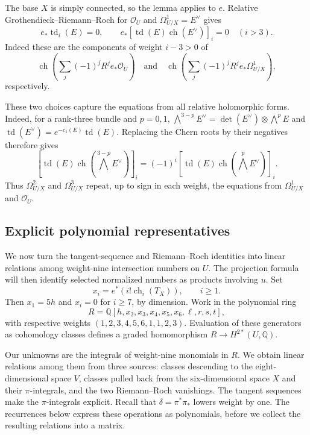 The base $X$ is simply connected, so the lemma applies to $e$.
Relative Grothendieck--Riemann--Roch
\cite[\S7, p.~113]{BorelSerre1958} for $\mathcal O_U$ and
$\Omega^1_{U/X}=E^\vee$ gives
\begin{equation}\label{eq:grr-vanishings}
 e_*\operatorname{td}_i(E)=0,
 \qquad
 e_*[\operatorname{td}(E)\operatorname{ch}(E^\vee)]_i=0
 \quad(i>3).
\end{equation}
Indeed these are the components of weight $i-3>0$ of
\[
 \operatorname{ch}\!\left(\sum_j(-1)^jR^je_*\mathcal O_U\right)
 \quad\text{and}\quad
 \operatorname{ch}\!\left(\sum_j(-1)^jR^je_*\Omega^1_{U/X}\right),
\]
respectively.

These two choices capture the equations from all relative holomorphic
forms. Indeed, for a rank-three bundle and $p=0,1$,
$\bigwedge^{3-p}E^\vee=\det(E^\vee)\otimes\bigwedge^pE$ and
$\operatorname{td}(E^\vee)=e^{-c_1(E)}\operatorname{td}(E)$.
Replacing the Chern roots by their negatives therefore gives
\[
 [\operatorname{td}(E)\operatorname{ch}(\textstyle\bigwedge^{3-p}E^\vee)]_i
 =(-1)^i
 [\operatorname{td}(E)\operatorname{ch}(\textstyle\bigwedge^pE^\vee)]_i.
\]
Thus $\Omega^2_{U/X}$ and $\Omega^3_{U/X}$ repeat, up to sign in
each weight, the equations from $\Omega^1_{U/X}$ and $\mathcal O_U$.

\subsection{Explicit polynomial representatives}

We now turn the tangent-sequence and Riemann--Roch identities into
linear relations among weight-nine intersection numbers on $U$. The
projection formula will then identify selected normalized numbers as
products involving $u$.
Set
\[
 x_i=e^*(i!\operatorname{ch}_i(T_X)),\qquad i\ge1.
\]
Then $x_1=5h$ and $x_i=0$ for $i\ge7$, by dimension. Work in the
polynomial ring
\[
 R=\mathbb Q[h,x_2,x_3,x_4,x_5,x_6,\ell,r,s,t],
\]
with respective weights $(1,2,3,4,5,6,1,1,2,3)$.
Evaluation of these generators as cohomology classes defines a graded
homomorphism $R\to H^{2*}(U,\mathbb Q)$.

Our unknowns are the integrals of weight-nine monomials in $R$.
We obtain linear relations among them from three sources: classes
descending to the eight-dimensional space $V$, classes pulled back
from the six-dimensional space $X$ and their $\pi$-integrals, and the
two Riemann--Roch vanishings. The tangent sequences make the
$\pi$-integrals explicit. Recall that
$\delta=\pi^*\pi_*$ lowers weight by one. The recurrences below
express these operations as polynomials, before we collect the
resulting relations into a matrix.

